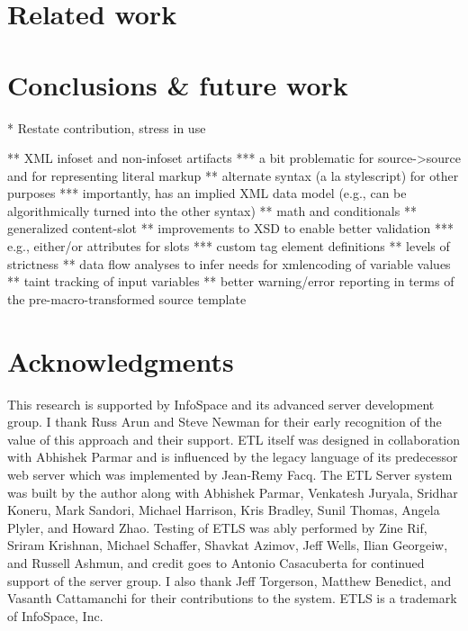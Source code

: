 \documentclass{www2003-submission}
\begin{document}
\section{Related work}



\section{Conclusions \& future work}

* Restate contribution, stress in use


** XML infoset and non-infoset artifacts
*** a bit problematic for source->source and for representing literal markup
** alternate syntax (a la stylescript) for other purposes
*** importantly, has an implied XML data model (e.g., can be algorithmically turned into the other syntax)
** math and conditionals
** generalized content-slot
** improvements to XSD to enable better validation
*** e.g., either/or attributes for slots
*** custom tag element definitions
** levels of strictness
** data flow analyses to infer needs for xmlencoding of variable values
** taint tracking of input variables
** better warning/error reporting in terms of the pre-macro-transformed source template


\section{Acknowledgments}
This research is supported by InfoSpace and its advanced server
development group.  I thank Russ Arun and Steve Newman for their early
recognition of the value of this approach and their support.  ETL
itself was designed in collaboration with Abhishek Parmar and is
influenced by the legacy language of its predecessor web server which
was implemented by Jean-Remy Facq.  The ETL Server system was built by
the author along with Abhishek Parmar, Venkatesh Juryala, Sridhar
Koneru, Mark Sandori, Michael Harrison, Kris Bradley, Sunil Thomas,
Angela Plyler, and Howard Zhao.  Testing of ETLS was ably performed by
Zine Rif, Sriram Krishnan, Michael Schaffer, Shavkat Azimov, Jeff
Wells, Ilian Georgeiw, and Russell Ashmun, and credit goes to Antonio
Casacuberta for continued support of the server group.  I also thank
Jeff Torgerson, Matthew Benedict, and Vasanth Cattamanchi for their
contributions to the system. ETLS is a trademark of InfoSpace, Inc.




%
\appendix
\end{document}
